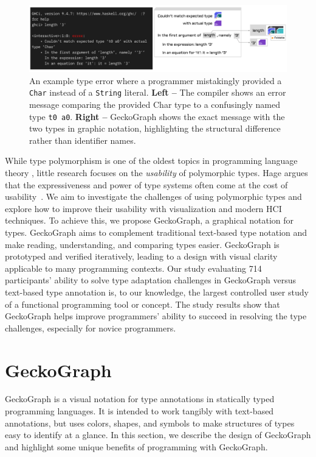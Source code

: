 \begin{figure}[hbt]
  \includegraphics[width=\linewidth]{figures/Foldable}
  \caption[Comparison between GeckoGraph and compiler error message]{\label{fig:example-foldable} An example type error where a programmer mistakingly provided a \texttt{Char} instead of a \texttt{String} literal. \textbf{Left --} The compiler shows an error message comparing the provided Char type to a confusingly named type \texttt{t0 a0}. \textbf{Right --} GeckoGraph shows the exact message with the two types in graphic notation, highlighting the structural difference rather than identifier names.}
\end{figure}


While type polymorphism is one of the oldest topics in programming language theory \cite{Cardelli1987-fp}, little research focuses on the \textit{usability} of polymorphic types. Hage argues that the expressiveness and power of type systems often come at the cost of usability~\cite{Hage2020-hg}. We aim to investigate the challenges of using polymorphic types and explore how to improve their usability with visualization and modern HCI techniques. To achieve this, we propose GeckoGraph, a graphical notation for types. GeckoGraph aims to complement traditional text-based type notation and make reading, understanding, and comparing types easier. GeckoGraph is prototyped and verified iteratively, leading to a design with visual clarity applicable to many programming contexts. Our study evaluating 714 participants' ability to solve type adaptation challenges in GeckoGraph versus text-based type annotation is, to our knowledge, the largest controlled user study of a functional programming tool or concept. The study results show that GeckoGraph helps improve programmers' ability to succeed in resolving the type challenges, especially for novice programmers.


\section{GeckoGraph}

GeckoGraph is a visual notation for type annotations in statically typed programming languages. It is intended to work tangibly with text-based annotations, but uses colors, shapes, and symbols to make structures of types easy to identify at a glance. In this section, we describe the design of GeckoGraph and highlight some unique benefits of programming with GeckoGraph.
        

